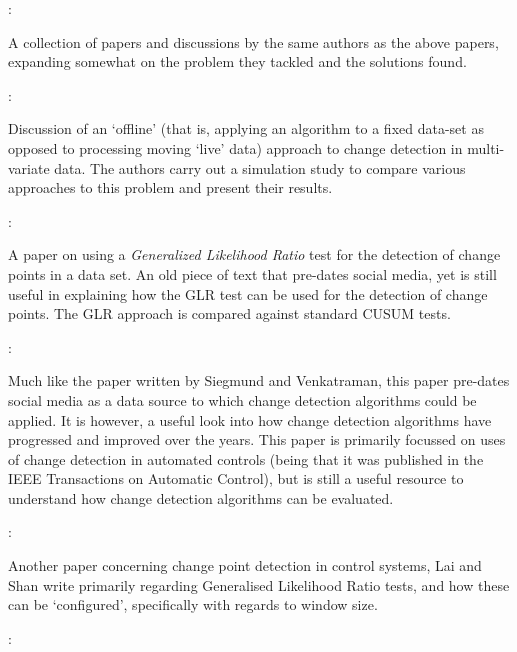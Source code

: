 \documentclass{uvamscse}
\begin{document}
\noindent\cite{tartakovsky2005nonparametric}: \textbf{}\smallskip

\noindent A collection of papers and discussions by the same authors as the above papers, expanding somewhat on the problem they tackled and the solutions found.\bigskip

\noindent\cite{matteson2014nonparametric}: \textbf{}\smallskip

Discussion of an `offline' (that is, applying an algorithm to a fixed data-set as opposed to processing moving `live' data) approach to change detection in multi-variate data. The authors carry out a simulation study to compare various approaches to this problem and present their results.\bigskip

\noindent\cite{siegmund1995using}: \textbf{}\smallskip

\noindent A paper on using a \textit{Generalized Likelihood Ratio} test for the detection of change points in a data set. An old piece of text that pre-dates social media, yet is still useful in explaining how the GLR test can be used for the detection of change points. The GLR approach is compared against standard CUSUM tests.\bigskip

\noindent\cite{willsky1976generalized}: \textbf{}\smallskip

\noindent Much like the paper written by Siegmund and Venkatraman, this paper pre-dates social media as a data source to which change detection algorithms could be applied. It is however, a useful look into how change detection algorithms have progressed and improved over the years. This paper is primarily focussed on uses of change detection in automated controls (being that it was published in the IEEE Transactions on Automatic Control), but is still a useful resource to understand how change detection algorithms can be evaluated.\bigskip

\noindent\cite{lai1999efficient}: \textbf{}\smallskip

\noindent Another paper concerning change point detection in control systems, Lai and Shan write primarily regarding Generalised Likelihood Ratio tests, and how these can be ‘configured’, specifically with regards to window size.\bigskip

\noindent\cite{bersimis2007multivariate}: \textbf{}\smallskip
\end{document}
